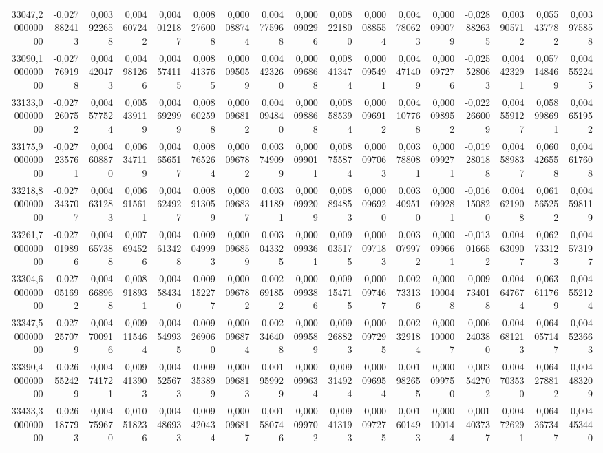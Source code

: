\begin{longtable}{rrrrrrrrrrrrrrrrr}
33047,200000000 & -0,027882413 & 0,003922658 & 0,004607242 & 0,004012187 & 0,008276008 & 0,000088744 & 0,004775968 & 0,000090296 & 0,008221800 & 0,000088554 & 0,004780623 & 0,000090079 & -0,028882635 & 0,003905712 & 0,055437782 & 0,003975858\\
33090,100000000 & -0,027769198 & 0,004420473 & 0,004981266 & 0,004574115 & 0,008413765 & 0,000095059 & 0,004423260 & 0,000096868 & 0,008413474 & 0,000095491 & 0,004471409 & 0,000097276 & -0,025528063 & 0,004423291 & 0,057148469 & 0,004552245\\
33133,000000000 & -0,027260752 & 0,004577524 & 0,005439119 & 0,004692999 & 0,008602598 & 0,000096812 & 0,004094840 & 0,000098868 & 0,008585394 & 0,000096912 & 0,004107768 & 0,000098952 & -0,022266009 & 0,004559127 & 0,058998691 & 0,004651952\\
33175,900000000 & -0,027235761 & 0,004608870 & 0,006347119 & 0,004656517 & 0,008765264 & 0,000096782 & 0,003749099 & 0,000099011 & 0,008755874 & 0,000097063 & 0,003788081 & 0,000099271 & -0,019280188 & 0,004589837 & 0,060426558 & 0,004617608\\
33218,800000000 & -0,027343707 & 0,004631283 & 0,006915611 & 0,004624927 & 0,008913059 & 0,000096837 & 0,003411891 & 0,000099209 & 0,008894853 & 0,000096920 & 0,003409510 & 0,000099281 & -0,016150820 & 0,004621908 & 0,061565252 & 0,004598119\\
33261,700000000 & -0,027019896 & 0,004657388 & 0,007694526 & 0,004613428 & 0,009049993 & 0,000096859 & 0,003043325 & 0,000099361 & 0,009035175 & 0,000097183 & 0,003079972 & 0,000099661 & -0,013016652 & 0,004630907 & 0,062733123 & 0,004573197\\
33304,600000000 & -0,027051692 & 0,004668968 & 0,008918931 & 0,004584340 & 0,009152277 & 0,000096782 & 0,002691852 & 0,000099386 & 0,009154715 & 0,000097467 & 0,002733136 & 0,000100048 & -0,009734018 & 0,004647674 & 0,063611769 & 0,004552124\\
33347,500000000 & -0,027257079 & 0,004700916 & 0,009115464 & 0,004549935 & 0,009269060 & 0,000096874 & 0,002346408 & 0,000099589 & 0,009268823 & 0,000097295 & 0,002329184 & 0,000100007 & -0,006240380 & 0,004681213 & 0,064057147 & 0,004523663\\
33390,400000000 & -0,026552429 & 0,004741721 & 0,009413903 & 0,004525673 & 0,009353899 & 0,000096813 & 0,001959929 & 0,000099634 & 0,009314924 & 0,000096954 & 0,001982655 & 0,000099750 & -0,002542702 & 0,004703530 & 0,064278812 & 0,004483209\\
33433,300000000 & -0,026187793 & 0,004759670 & 0,010518236 & 0,004486933 & 0,009420434 & 0,000096817 & 0,001580746 & 0,000099702 & 0,009413193 & 0,000097275 & 0,001601493 & 0,000100144 & 0,001403737 & 0,004726291 & 0,064367347 & 0,004453440\\

\end{longtable}
